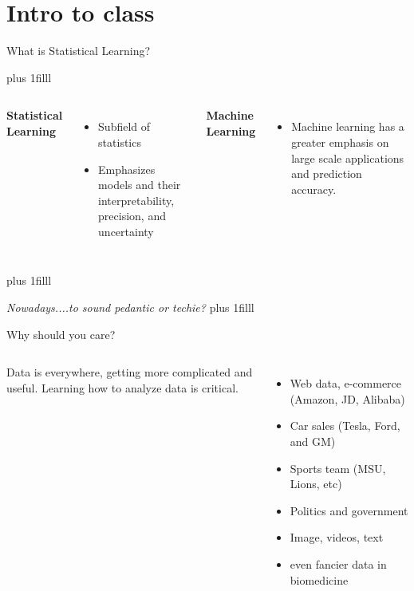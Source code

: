 \documentclass[aspectratio=169,usenames,dvipsnames]{beamer}
\newcommand{\bvfill}{\vskip0pt plus 1filll}
\begin{document}
\section{Intro to class}

%
%
\begin{frame}{What is Statistical Learning?}


	\bvfill
	\begin{columns}
	\centering
\textbf{Statistical Learning}
\begin{itemize}
	\item Subfield of statistics
	\item Emphasizes models and their interpretability, precision, and uncertainty
\end{itemize}

	\centering
	\textbf{Machine Learning }

	\begin{itemize}
\item
Machine learning has a greater emphasis on large scale applications and prediction accuracy.
	\end{itemize}
	\end{columns}

	\bvfill \centering

	\textit{Nowadays....to sound pedantic or techie?}
	\bvfill

\end{frame}
\begin{frame}[c]{Why should you care?}

\begin{columns}

Data is everywhere, getting more complicated and useful. Learning how to analyze data is critical.
\begin{itemize}
	\item
Web data, e-commerce (Amazon, JD, Alibaba)
	\item
Car sales (Tesla, Ford, and GM)
	\item
Sports team (MSU, Lions, etc)
\item Politics and government
\item Image, videos, text
\item even fancier data in biomedicine

\end{itemize}



\end{columns}

\end{frame}
\end{document}
